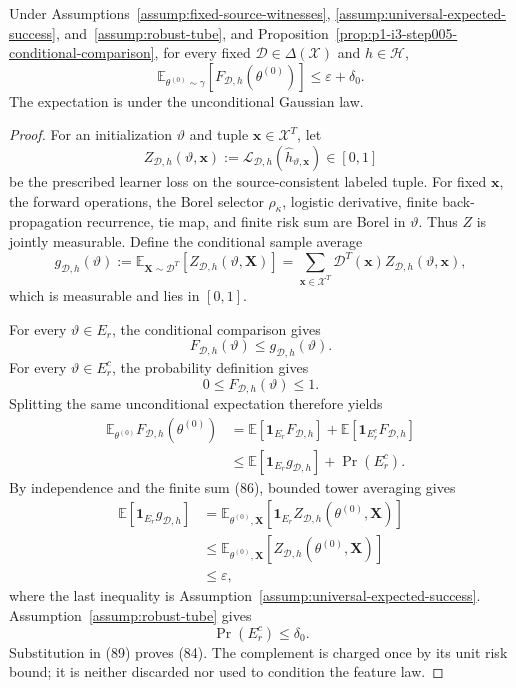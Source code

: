 \begin{proposition}
\label{prop:p1-i3-step006-event-split}
Under Assumptions~\ref{assump:fixed-source-witnesses},
\ref{assump:universal-expected-success}, and~\ref{assump:robust-tube}, and
Proposition~\ref{prop:p1-i3-step005-conditional-comparison}, for every fixed
$\mathcal D\in\Delta(\mathcal X)$ and $h\in\mathcal H$,
\[
\mathbb E_{\theta^{(0)}\sim\gamma}
[F_{\mathcal D,h}(\theta^{(0)})]\leq\varepsilon+\delta_0.
\tag{84}
\]
The expectation is under the unconditional Gaussian law.
\end{proposition}

\begin{proof}
For an initialization $\vartheta$ and tuple $\mathbf x\in\mathcal X^T$, let
\[
Z_{\mathcal D,h}(\vartheta,\mathbf x):=
\mathcal L_{\mathcal D,h}(\widehat h_{\vartheta,\mathbf x})\in[0,1]
\tag{85}
\]
be the prescribed learner loss on the source-consistent labeled tuple.  For
fixed $\mathbf x$, the forward operations, the Borel selector
$\rho_\kappa$, logistic derivative, finite back-propagation recurrence, tie
map, and finite risk sum are Borel in $\vartheta$.  Thus $Z$ is jointly
measurable.  Define the conditional sample average
\[
g_{\mathcal D,h}(\vartheta):=
\mathbb E_{\mathbf X\sim\mathcal D^T}
[Z_{\mathcal D,h}(\vartheta,\mathbf X)]
=\sum_{\mathbf x\in\mathcal X^T}\mathcal D^T(\mathbf x)
Z_{\mathcal D,h}(\vartheta,\mathbf x),
\tag{86}
\]
which is measurable and lies in $[0,1]$.

For every $\vartheta\in E_r$, the conditional comparison gives
\[
F_{\mathcal D,h}(\vartheta)\leq g_{\mathcal D,h}(\vartheta).
\tag{87}
\]
For every $\vartheta\in E_r^c$, the probability definition gives
\[
0\leq F_{\mathcal D,h}(\vartheta)\leq1.
\tag{88}
\]
Splitting the same unconditional expectation therefore yields
\[
\begin{aligned}
\mathbb E_{\theta^{(0)}}F_{\mathcal D,h}(\theta^{(0)})
&=\mathbb E[\mathbf1_{E_r}F_{\mathcal D,h}]
 +\mathbb E[\mathbf1_{E_r^c}F_{\mathcal D,h}]\\
&\leq\mathbb E[\mathbf1_{E_r}g_{\mathcal D,h}]
 +\Pr(E_r^c).
\end{aligned}
\tag{89}
\]
By independence and the finite sum (86), bounded tower averaging gives
\[
\begin{aligned}
\mathbb E[\mathbf1_{E_r}g_{\mathcal D,h}]
&=\mathbb E_{\theta^{(0)},\mathbf X}
[\mathbf1_{E_r}Z_{\mathcal D,h}(\theta^{(0)},\mathbf X)]\\
&\leq\mathbb E_{\theta^{(0)},\mathbf X}
[Z_{\mathcal D,h}(\theta^{(0)},\mathbf X)]\\
&\leq\varepsilon,
\end{aligned}
\tag{90}
\]
where the last inequality is Assumption~\ref{assump:universal-expected-success}.
Assumption~\ref{assump:robust-tube} gives
\[
\Pr(E_r^c)\leq\delta_0.
\tag{91}
\]
Substitution in (89) proves (84).  The complement is charged once by its
unit risk bound; it is neither discarded nor used to condition the feature
law.
\end{proof}

